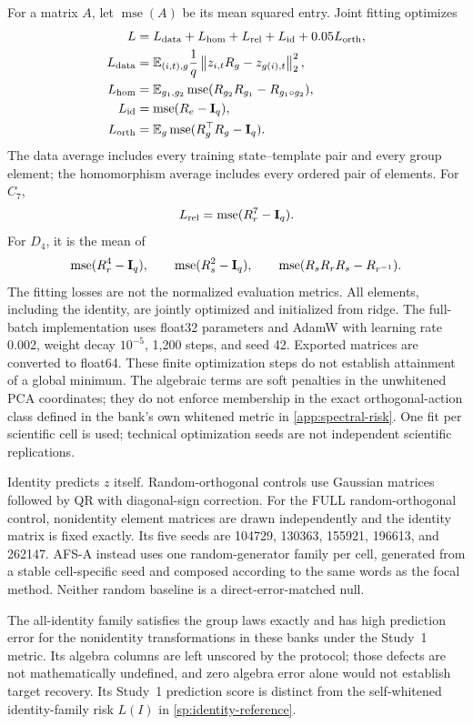 For a matrix $A$, let $\operatorname{mse}(A)$ be its mean
squared entry.
Joint fitting optimizes
\begin{align*}
 L
 &=
 L_{\rm data}+L_{\rm hom}+L_{\rm rel}+L_{\rm id}
 +0.05L_{\rm orth},
 \\
 L_{\rm data}
 &=
 \mathbb E_{(i,t),g}
 \frac1q
 \left\lVert z_{i,t}R_g-z_{g(i),t}\right\rVert_2^2,
 \\
 L_{\rm hom}
 &=
 \mathbb E_{g_1,g_2}
 \operatorname{mse}
 (R_{g_2}R_{g_1}-R_{g_1\circ g_2}),
 \\
 L_{\rm id}
 &=
 \operatorname{mse}(R_e-\mathbf{I}_q),
 \\
 L_{\rm orth}
 &=
 \mathbb E_g
 \operatorname{mse}(R_g^\top R_g-\mathbf{I}_q).
\end{align*}
The data average includes every training state--template
pair and every group element; the homomorphism average
includes every ordered pair of elements.
For $C_7$,
\[
 L_{\rm rel}
 =
 \operatorname{mse}(R_r^7-\mathbf{I}_q).
\]
For $D_4$, it is the mean of
\[
 \operatorname{mse}(R_r^4-\mathbf{I}_q),\qquad
 \operatorname{mse}(R_s^2-\mathbf{I}_q),\qquad
 \operatorname{mse}(R_sR_rR_s-R_{r^{-1}}).
\]
The fitting losses are not the normalized evaluation metrics.
All elements, including the identity, are jointly optimized
and initialized from ridge.
The full-batch implementation uses float32 parameters and
AdamW with learning rate 0.002, weight decay $10^{-5}$,
1,200 steps, and seed 42.
Exported matrices are converted to float64.
These finite optimization steps do not establish attainment
of a global minimum.
The algebraic terms are soft penalties in the unwhitened
PCA coordinates; they do not enforce membership in the exact
orthogonal-action class defined in the bank's own whitened
metric in \cref{app:spectral-risk}.
One fit per scientific cell is used;
technical optimization seeds are not independent scientific
replications.

Identity predicts $z$ itself.
Random-orthogonal controls use Gaussian matrices followed
by QR with diagonal-sign correction.
For the FULL random-orthogonal control, nonidentity element
matrices are drawn independently and the identity matrix
is fixed exactly.
Its five seeds are 104729, 130363, 155921, 196613, and 262147.
AFS-A instead uses one random-generator family per cell,
generated from a stable cell-specific seed and composed
according to the same words as the focal method.
Neither random baseline is a direct-error-matched null.

The all-identity family satisfies the group laws exactly
and has high prediction error for the nonidentity
transformations in these banks under the Study~1 metric.
Its algebra columns are left unscored by the protocol;
those defects are not mathematically undefined, and zero
algebra error alone would not establish target recovery.
Its Study~1 prediction score is distinct from the
self-whitened identity-family risk $L(I)$
in \cref{sp:identity-reference}.

